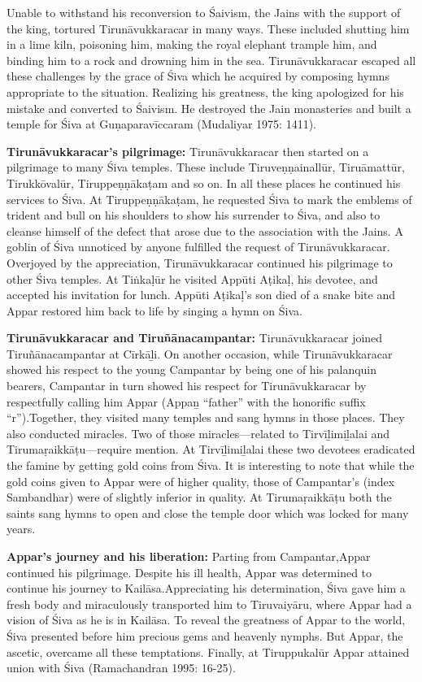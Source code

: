 Unable to withstand his reconversion to Śaivism, the Jains with the support of the king, tortured Tirunāvukkaracar in many ways. These included shutting him in a lime kiln, poisoning him, making the royal elephant trample him, and binding him to a rock and drowning him in the sea. Tirunāvukkaracar escaped all these challenges by the grace of Śiva which he acquired by composing hymns appropriate to the situation. Realizing his greatness, the king apologized for his mistake and converted to Śaivism. He destroyed the Jain monasteries and built a temple for Śiva at Guṇaparavīccaram (Mudaliyar 1975: 1411).

\textbf{Tirunāvukkaracar’s pilgrimage:} Tirunāvukkaracar then started on a pilgrimage to many Śiva temples. These include Tiruveṇṇainallūr, Tiruāmattūr, Tirukkōvalūr, Tiruppeṇṇākaṭam and so on. In all these places he continued his services to Śiva. At Tiruppeṇṇākaṭam, he requested Śiva to mark the emblems of trident and bull on his shoulders to show his surrender to Śiva, and also to cleanse himself of the defect that arose due to the association with the Jains. A goblin of Śiva unnoticed by anyone fulfilled the request of Tirunāvukkaracar. Overjoyed by the appreciation, Tirunāvukkaracar continued his pilgrimage to other Śiva temples. At Tiṅkaḷūr he visited Appūti Aṭikaḷ, his devotee, and accepted his invitation for lunch. Appūti Aṭikaḷ’s son died of a snake bite and Appar restored him back to life by singing a hymn on Śiva.

\textbf{Tirunāvukkaracar and Tiruñānacampantar:} Tirunāvukkaracar joined Tiruñānacampantar at Cīrkāḻi. On another occasion, while Tirunāvukkaracar showed his respect to the young Campantar by being one of his palanquin bearers, Campantar in turn showed his respect for Tirunāvukkaracar by respectfully calling him Appar (Appaṉ “father” with the honorific suffix “r”).Together, they visited many temples and sang hymns in those places. They also conducted miracles. Two of those miracles—related to Tirvīḻimiḻalai and Tirumaṛaikkāṭu—require mention. At Tirvīḻimiḻalai these two devotees eradicated the famine by getting gold coins from Śiva. It is interesting to note that while the gold coins given to Appar were of higher quality, those of Campantar’s (index Sambandhar) were of slightly inferior in quality. At Tirumaṛaikkāṭu both the saints sang hymns to open and close the temple door which was locked for many years.

\textbf{Appar’s journey and his liberation:} Parting from Campantar,Appar continued his pilgrimage. Despite his ill health, Appar was determined to continue his journey to Kailāsa.Appreciating his determination, Śiva gave him a fresh body and miraculously transported him to Tiruvaiyāru, where Appar had a vision of Śiva as he is in Kailāsa. To reveal the greatness of Appar to the world, Śiva presented before him precious gems and heavenly nymphs. But Appar, the ascetic, overcame all these temptations. Finally, at Tiruppukalūr Appar attained union with Śiva (Ramachandran 1995: 16-25).

